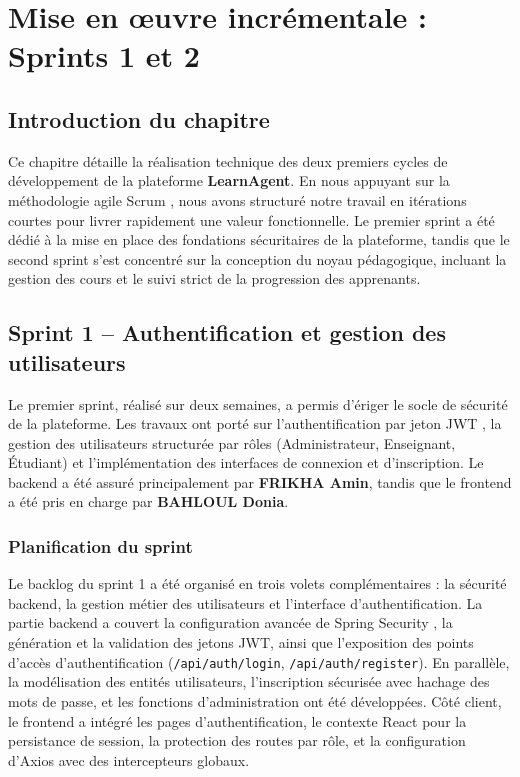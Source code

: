 \documentclass[12pt,a4paper]{report}
\begin{document}
\chapter{Mise en œuvre incrémentale : Sprints 1 et 2}

\section*{Introduction du chapitre}
Ce chapitre détaille la réalisation technique des deux premiers cycles de développement de la plateforme \textbf{LearnAgent}. En nous appuyant sur la méthodologie agile Scrum \cite{scrum}, nous avons structuré notre travail en itérations courtes pour livrer rapidement une valeur fonctionnelle. Le premier sprint a été dédié à la mise en place des fondations sécuritaires de la plateforme, tandis que le second sprint s'est concentré sur la conception du noyau pédagogique, incluant la gestion des cours et le suivi strict de la progression des apprenants.

\section{Sprint 1 -- Authentification et gestion des utilisateurs}

Le premier sprint, réalisé sur deux semaines, a permis d'ériger le socle de sécurité de la plateforme. Les travaux ont porté sur l’authentification par jeton JWT \cite{jwt}, la gestion des utilisateurs structurée par rôles (Administrateur, Enseignant, Étudiant) et l’implémentation des interfaces de connexion et d’inscription. Le backend a été assuré principalement par \textbf{FRIKHA Amin}, tandis que le frontend a été pris en charge par \textbf{BAHLOUL Donia}.

\subsection{Planification du sprint}

Le backlog du sprint 1 a été organisé en trois volets complémentaires : la sécurité backend, la gestion métier des utilisateurs et l’interface d’authentification. La partie backend a couvert la configuration avancée de Spring Security \cite{spring_security}, la génération et la validation des jetons JWT, ainsi que l'exposition des points d’accès d’authentification (\texttt{/api/auth/login}, \texttt{/api/auth/register}). En parallèle, la modélisation des entités utilisateurs, l’inscription sécurisée avec hachage des mots de passe, et les fonctions d’administration ont été développées. Côté client, le frontend a intégré les pages d’authentification, le contexte React \cite{react} pour la persistance de session, la protection des routes par rôle, et la configuration d’Axios avec des intercepteurs globaux.
\end{document}
